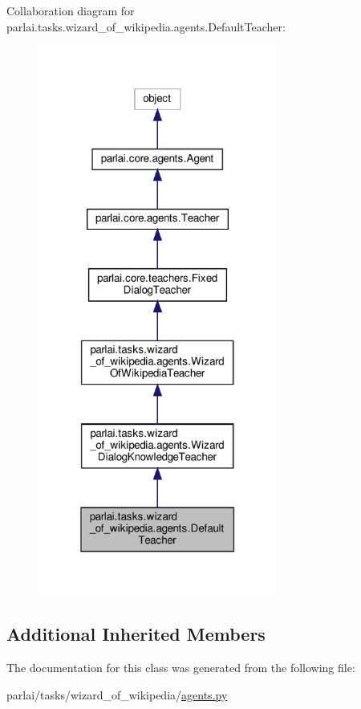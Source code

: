 Collaboration diagram for parlai.\+tasks.\+wizard\+\_\+of\+\_\+wikipedia.\+agents.\+Default\+Teacher\+:
\nopagebreak
\begin{figure}[H]
\begin{center}
\leavevmode
\includegraphics[width=223pt]{classparlai_1_1tasks_1_1wizard__of__wikipedia_1_1agents_1_1DefaultTeacher__coll__graph}
\end{center}
\end{figure}
\subsection*{Additional Inherited Members}


The documentation for this class was generated from the following file\+:\begin{DoxyCompactItemize}
\item 
parlai/tasks/wizard\+\_\+of\+\_\+wikipedia/\hyperlink{parlai_2tasks_2wizard__of__wikipedia_2agents_8py}{agents.\+py}\end{DoxyCompactItemize}
